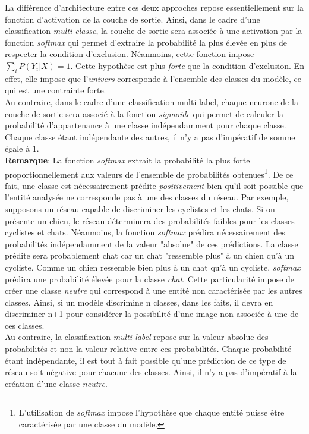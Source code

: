 \noindent La différence d'architecture entre ces deux approches repose essentiellement sur la fonction d'activation de la couche de sortie. Ainsi, dans le cadre d'une classification \textit{multi-classe}, la couche de sortie sera associée à une activation par la fonction \textit{softmax} qui permet d'extraire la probabilité la plus élevée en plus de respecter la condition d'exclusion. Néanmoins, cette fonction impose $\sum_i P(Y_i | X) = 1$. Cette hypothèse est plus \textit{forte} que la condition d'exclusion. En effet, elle impose que l'\textit{univers} corresponde à l'ensemble des classes du modèle, ce qui est une contrainte forte. \\

\noindent Au contraire, dans le cadre d'une classification multi-label, chaque neurone de la couche de sortie sera associé à la fonction \textit{sigmoïde} qui permet de calculer la probabilité d'appartenance à une classe indépendamment pour chaque classe. Chaque classe étant indépendante des autres, il n'y a pas d'impératif de somme égale à 1.\\

\noindent \textbf{Remarque}: La fonction \textit{softmax} extrait la probabilité la plus forte proportionnellement aux valeurs de l'ensemble de probabilités obtenues\footnote{L'utilisation de \textit{softmax} impose l'hypothèse que chaque entité puisse être caractérisée par une classe du modèle.}. De ce fait, une classe est nécessairement prédite \textit{positivement} bien qu'il soit possible que l'entité analysée ne corresponde pas à une des classes du réseau. Par exemple, supposons un réseau capable de discriminer les cyclistes et les chats. Si on présente un chien, le réseau déterminera des probabilités faibles pour les classes cyclistes et chats. Néanmoins, la fonction \textit{softmax} prédira nécessairement des probabilités indépendamment de la valeur "absolue" de ces prédictions. La classe prédite sera probablement chat car un chat "ressemble plus" à un chien qu'à un cycliste. Comme un chien ressemble bien plus à un chat qu'à un cycliste, \textit{softmax} prédira une probabilité élevée pour la classe \textit{chat}. Cette particularité impose de créer une classe \textit{neutre} qui correspond à une entité non caractérisée par les autres classes. Ainsi, si un modèle discrimine n classes, dans les faits, il devra en discriminer n+1 pour considérer la possibilité d'une image non associée à une de ces classes.\\

\noindent Au contraire, la classification \textit{multi-label} repose sur la valeur absolue des probabilités et non la valeur relative entre ces probabilités. Chaque probabilité étant indépendante, il est tout à fait possible qu'une prédiction de ce type de réseau soit négative pour chacune des classes. Ainsi, il n'y a pas d'impératif à la création d'une classe \textit{neutre}. \\

